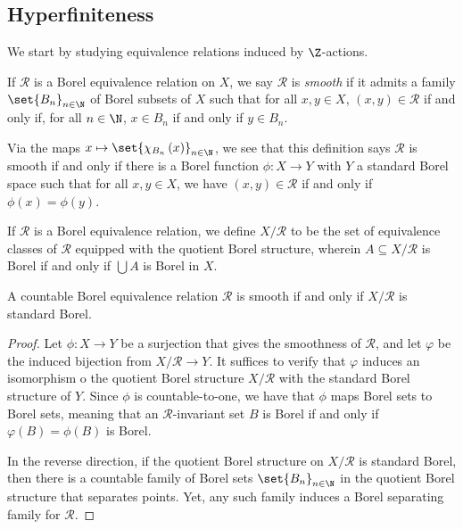 \documentclass[10pt]{mypackage}
\begin{document}
\subsection{Hyperfiniteness}%
We start by studying equivalence relations induced by $\Z$-actions.
\begin{definition}
  If $\mathcal{R}$ is a Borel equivalence relation on $X$, we say $\mathcal{R}$ is \textit{smooth} if it admits a family $\set{B_n}_{n\in \N}$ of Borel subsets of $X$ such that for all $x,y\in X$, $\left( x,y \right)\in \mathcal{R}$ if and only if, for all $n\in \N$, $x\in B_n$ if and only if $y\in B_n$.
\end{definition}
Via the maps $x\mapsto \set{\chi_{B_n}\left( x \right)}_{n\in \N}$, we see that this definition says $\mathcal{R}$ is smooth if and only if there is a Borel function $\phi\colon X\rightarrow Y$ with $Y$ a standard Borel space such that for all $x,y\in X$, we have $\left( x,y \right)\in \mathcal{R}$ if and only if $\phi(x) = \phi(y)$.
\begin{definition}
  If $\mathcal{R}$ is a Borel equivalence relation, we define $X/\mathcal{R}$ to be the set of equivalence classes of $\mathcal{R}$ equipped with the quotient Borel structure, wherein $A\subseteq X/\mathcal{R}$ is Borel if and only if $\bigcup A$ is Borel in $X$.
\end{definition}
\begin{proposition}
  A countable Borel equivalence relation $\mathcal{R}$ is smooth if and only if $X/\mathcal{R}$ is standard Borel.
\end{proposition}
\begin{proof}
  Let $\phi\colon X\rightarrow Y$ be a surjection that gives the smoothness of $\mathcal{R}$, and let $ \varphi $ be the induced bijection from $X/\mathcal{R}\rightarrow Y$. It suffices to verify that $\varphi$ induces an isomorphism o the quotient Borel structure $X/\mathcal{R}$ with the standard Borel structure of $Y$. Since $\phi$ is countable-to-one, we have that $\phi$ maps Borel sets to Borel sets, meaning that an $\mathcal{R}$-invariant set $B$ is Borel if and only if $ \varphi\left( B \right) = \phi(B) $ is Borel.

  In the reverse direction, if the quotient Borel structure on $X/\mathcal{R}$ is standard Borel, then there is a countable family of Borel sets $\set{B_n}_{n\in \N}$ in the quotient Borel structure that separates points. Yet, any such family induces a Borel separating family for $\mathcal{R}$.
\end{proof}
\end{document}
